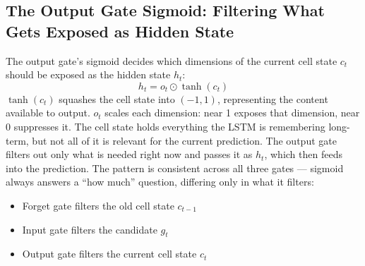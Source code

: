 \subsection{The Output Gate Sigmoid: Filtering What Gets Exposed as Hidden State}
The output gate's sigmoid decides which dimensions of the current cell state $c_t$ should be exposed as the hidden state $h_t$:
\[
h_t = o_t \odot \tanh(c_t)
\]
$\tanh(c_t)$ squashes the cell state into $(-1, 1)$, representing the content available to output. $o_t$ scales each dimension: near 1 exposes that dimension, near 0 suppresses it. The cell state holds everything the LSTM is remembering long-term, but not all of it is relevant for the current prediction. The output gate filters out only what is needed right now and passes it as $h_t$, which then feeds into the prediction. The pattern is consistent across all three gates --- sigmoid always answers a ``how much'' question, differing only in what it filters:
\begin{itemize}
    \item Forget gate filters the old cell state $c_{t-1}$
    \item Input gate filters the candidate $g_t$
    \item Output gate filters the current cell state $c_t$
\end{itemize}